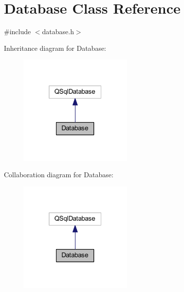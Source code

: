 \hypertarget{class_database}{}\section{Database Class Reference}
\label{class_database}


{\ttfamily \#include $<$database.\+h$>$}



Inheritance diagram for Database\+:
\nopagebreak
\begin{figure}[H]
\begin{center}
\leavevmode
\includegraphics[width=160pt]{class_database__inherit__graph}
\end{center}
\end{figure}


Collaboration diagram for Database\+:
\nopagebreak
\begin{figure}[H]
\begin{center}
\leavevmode
\includegraphics[width=160pt]{class_database__coll__graph}
\end{center}
\end{figure}
